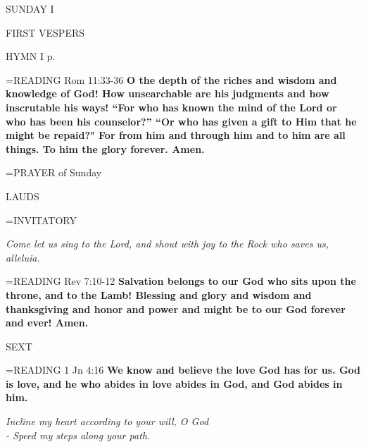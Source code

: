 \begin{center}\normalsize SUNDAY I\\
\end{center}

\begin{flushleft}\normalsize FIRST VESPERS\\\end{flushleft}

HYMN I p. \pageref{ordinaryTime:firstHymn}

\hangindent=\parindent \small{READING} Rom 11:33-36 \textbf{O the depth of the riches and wisdom and knowledge of God! How unsearchable are his judgments and how inscrutable his ways! “For who has known the mind of the Lord or who has been his counselor?” “Or who has given a gift to Him that he might be repaid?"  For from him and through him and to him are all things. To him the glory forever. Amen.\\}

\hangindent=\parindent \small{PRAYER  of Sunday}

\begin{flushleft}\normalsize LAUDS\\\end{flushleft}

\hangindent=\parindent \small{INVITATORY}
\begin{center}
\textit{Come let us sing to the Lord, and shout with joy to the Rock who saves us, alleluia.\\}
\end{center}

\hangindent=\parindent \small{READING} Rev 7:10-12 \textbf{Salvation belongs to our God who sits upon the throne, and to the Lamb! Blessing and glory and wisdom and thanksgiving and honor and power and might be to our God forever and ever! Amen.\\}

\begin{flushleft}\normalsize SEXT\\\end{flushleft}

\hangindent=\parindent \small{READING} 1 Jn 4:16 \textbf{We know and believe the love God has for us. God is love, and he who abides in love abides in God, and God abides in him.}

\begin{center}
\textit{Incline my heart according to your will, O God\\
- Speed my steps along your path.}
\end{center}

